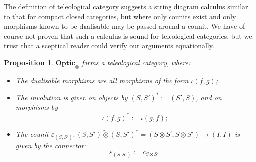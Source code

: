 \documentclass[11pt,letterpaper]{article}
\theoremstyle{plain}
\newtheorem{proposition}[theorem]{Proposition}
\theoremstyle{definition}
\newcommand{\Optic}{\mathbf{Optic}}
\newcommand{\switched}{\mathbin{\tilde{\otimes}}}
\begin{document}
The definition of teleological category suggests a string diagram calculus similar to that for compact closed categories, but where only counits exist and only morphisms known to be dualisable may be passed around a counit. We have of course not proven that such a calculus is sound for teleological categories, but we trust that a sceptical reader could verify our arguments equationally.

\begin{proposition}
  $\Optic_\otimes$ forms a teleological category, where:
  \begin{itemize}
  \item The dualisable morphisms are all morphisms of the form $\iota(f, g)$;
  \item The involution is given on objects by ${(S, S')}^* := (S', S)$, and on morphisms by \[\iota{(f, g)}^* := \iota(g, f);\]
  \item The counit $\varepsilon_{(S, S')} : (S, S') \switched {(S, S')}^* = (S \otimes S', S \otimes S') \to (I, I)$ is given by the connector: \[\varepsilon_{(S, S')} := c_{S \otimes S'}.\]
  \end{itemize}
\end{proposition}
\end{document}
